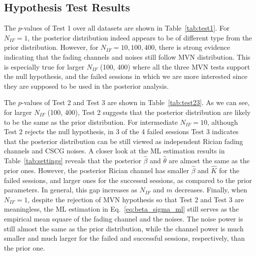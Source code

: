 \documentclass[journal,draftcls,onecolumn,12pt,twoside]{IEEEtran}
\begin{document}
\subsection{Hypothesis Test Results}
The $p$-values of Test 1 over all datasets are shown in Table~\ref{tab:test1}.
For $N_{IF} = 1$, the posterior distribution indeed appears to be of different
type from the prior distribution. However, for $N_{IF} = 10, 100, 400$, there is
strong evidence indicating that the fading channels and noises still follow MVN
distribution. This is especially true for larger $N_{IF}$ (100, 400) where all
the three MVN tests support the null hypothesis, and the failed sessions
in which we are more interested since they are supposed to be used in the
posterior analysis.

The $p$-values of Test 2 and Test 3 are shown in Table~\ref{tab:test23}. As we can see, for larger $N_{IF}$
 (100, 400), Test 2 suggests that the posterior distribution are likely to be
the same as the prior distribution. For intermediate $N_{IF} = 10$, although
Test 2 rejects the null hypothesis, in 3 of the 4 failed sessions Test 3
indicates that the posterior distribution can be still viewed as independent Rician fading
channels and CSCG noises. A closer look at the ML estimation results
in Table~\ref{tab:settings} reveals that the posterior $\hat{\beta}$ and
$\hat{\theta}$ are almost the same as the prior ones. However, the posterior
Rician channel has smaller $\hat{\beta}$ and $\hat{K}$ for the failed sessions,
and larger ones for the successul sessions, as compared to the prior parameters.
In general, this gap increases as $N_{IF}$ and $m$ decreases. Finally, when
$N_{IF} = 1$, despite the rejection of MVN hypothesis so that Test 2 and Test 3
are meaningless, the ML estimation in Eq.~\eqref{eq:beta_sigma_ml} still serves
as the empirical mean square of the fading channel and the noises. The noise
power is still almost the same as the prior distribution, while the channel
power is much smaller and much larger for the failed and successful
sessions, respectively, than the prior one.
\end{document}
